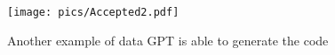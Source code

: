 \begin{figure}
    \centering
    \texttt{[image: pics/Accepted2.pdf]}
    \vspace{-7pt}
    \caption{Another example of data GPT is able to generate the code
    }
    \label{fig:accepted2}
    \vspace{-10pt}
\end{figure}